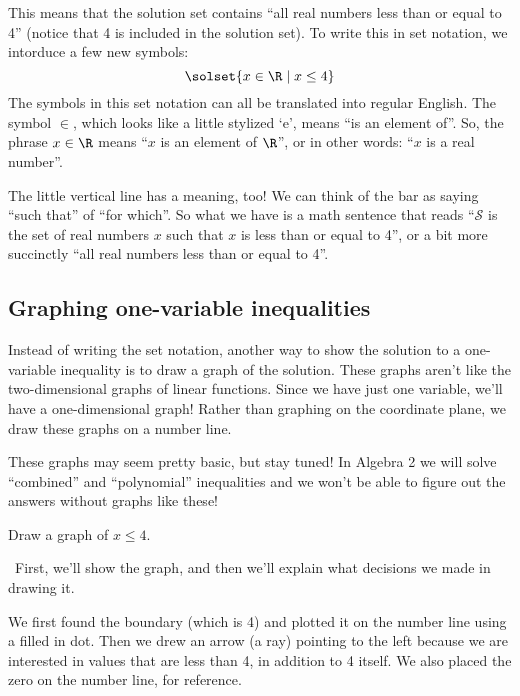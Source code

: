 This means that the solution set contains ``all real numbers less than or equal to 4'' (notice that 4 is included in the solution set). To write this in set notation, we intorduce a few new symbols: \[\solset{x \in \R \mid x \leq 4}\]
The symbols in this set notation can all be translated into regular English. The symbol $\in$, which looks like a little stylized `e', means ``is an element of''. So, the phrase $x\in\R$ means ``$x$ is an element of $\R$'', or in other words: ``$x$ is a real number''.

The little vertical line has a meaning, too! We can think of the bar as saying ``such that'' of ``for which''. So what we have is a math sentence that reads ``$\mathcal{S}$ is the set of real numbers $x$ such that $x$ is less than or equal to 4'', or a bit more succinctly ``all real numbers less than or equal to 4''.


\subsection{Graphing one-variable inequalities}

Instead of writing the set notation, another way to show the solution to a one-variable inequality is to draw a graph of the solution. These graphs aren't like the two-dimensional graphs of linear functions. Since we have just one variable, we'll have a one-dimensional graph! Rather than graphing on the coordinate plane, we draw these graphs on a number line.

These graphs may seem pretty basic, but stay tuned! In Algebra 2 we will solve ``combined'' and ``polynomial'' inequalities and we won't be able to figure out the answers without graphs like these!

\begin{boxedex}
Draw a graph of $x \leq 4$.

\exsoln\ First, we'll show the graph, and then we'll explain what decisions we made in drawing it.

\begin{center}
\end{center}

We first found the boundary (which is 4) and plotted it on the number line using a filled in dot. Then we drew an arrow (a ray) pointing to the left because we are interested in values that are less than 4, in addition to 4 itself. We also placed the zero on the number line, for reference.
\end{boxedex}

